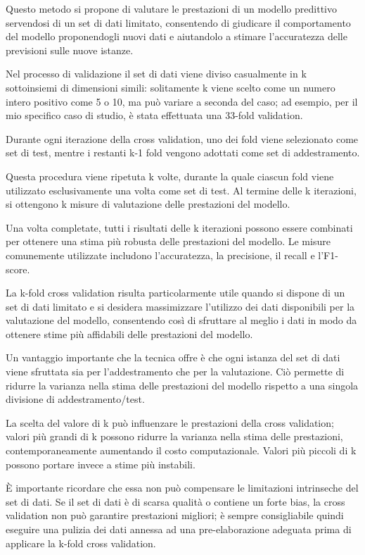 Questo metodo si propone di valutare le prestazioni di un modello predittivo servendosi di un set di dati limitato, consentendo di giudicare il comportamento del modello proponendogli nuovi dati e aiutandolo a stimare l'accuratezza delle previsioni sulle nuove istanze.

Nel processo di validazione il set di dati viene diviso casualmente in k sottoinsiemi di dimensioni simili: solitamente k viene scelto come un numero intero positivo come 5 o 10, ma può variare a seconda del caso; ad esempio, per il mio specifico caso di studio, è stata effettuata una 33-fold validation.

Durante ogni iterazione della cross validation, uno dei fold viene selezionato come set di test, mentre i restanti k-1 fold vengono adottati come set di addestramento. 

Questa procedura viene ripetuta k volte, durante la quale ciascun fold viene utilizzato esclusivamente una volta come set di test. Al termine delle k iterazioni, si ottengono k misure di valutazione delle prestazioni del modello.

Una volta completate, tutti i risultati delle k iterazioni possono essere combinati per ottenere una stima più robusta delle prestazioni del modello. Le misure comunemente utilizzate includono l'accuratezza, la precisione, il recall e l'F1-score.

La k-fold cross validation risulta particolarmente utile quando si dispone di un set di dati limitato e si desidera massimizzare l'utilizzo dei dati disponibili per la valutazione del modello, consentendo così di sfruttare al meglio i dati in modo da ottenere stime più affidabili delle prestazioni del modello.

Un vantaggio importante che la tecnica offre è che ogni istanza del set di dati viene sfruttata sia per l'addestramento che per la valutazione. Ciò permette di ridurre la varianza nella stima delle prestazioni del modello rispetto a una singola divisione di addestramento/test.

La scelta del valore di k può influenzare le prestazioni della cross validation; valori più grandi di k possono ridurre la varianza nella stima delle prestazioni, contemporaneamente aumentando il costo computazionale. Valori più piccoli di k possono portare invece a stime più instabili.

È importante ricordare che essa non può compensare le limitazioni intrinseche del set di dati. Se il set di dati è di scarsa qualità o contiene un forte bias, la cross validation non può garantire prestazioni migliori; è sempre consigliabile quindi eseguire una pulizia dei dati annessa ad una pre-elaborazione adeguata prima di applicare la k-fold cross validation. 

